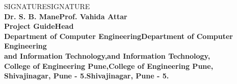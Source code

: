 \begin{center}		%

SIGNATURESIGNATURE\\
\normalsize{\bf{Dr. S. B. ManeProf. Vahida Attar\\
Project GuideHead}\\
Department of Computer EngineeringDepartment of Computer Engineering\\
and Information Technology,and Information Technology,\\
College of Engineering Pune,College of Engineering Pune,\\
Shivajinagar, Pune - 5.Shivajinagar, Pune - 5.}
\end{center}
